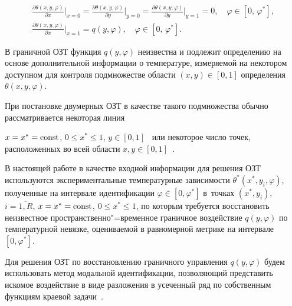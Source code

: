 \begin{gather}\label{eq:ulg:BoundaryCondition2}

\frac{\partial \theta (x,y,\varphi )}{\partial x}\Bigr|_{x=0} = 

\frac{\partial \theta (x,y,\varphi )}{\partial y}\Bigr|_{y=0} = \frac{\partial \theta (x, y,\varphi )}{\partial y}\Bigr|_{y=1} = 0,\quad \varphi  \in [0,\,\varphi ^*],

\\

\label{eq:ulg:BoundaryCondition2}

\frac{\partial \theta (x,y,\varphi )}{\partial x}\Bigr|_{x=1} = q(y,\varphi ),\quad\varphi  \in [0,\,\varphi ^*].

\end{gather}



В граничной ОЗТ функция $q(y,\varphi)$ неизвестна и подлежит определению на основе дополнительной информации о температуре, измеряемой на некотором доступном для контроля подмножестве области $( x,y ) \in [ 0, 1]$ определения $\theta(x,y,\varphi)$.

При постановке двумерных ОЗТ в качестве такого подмножества обычно рассматривается некоторая линия 

$x = {x^*} = \rm const$, $0 \le {x^*} \le 1$, $y \in [ 0,1 ]$~\cite{ulg:bib:Kuzin_2_D, ulg:bib:Alifanov_OZT, ulg:bib:Reinhardt} или некоторое число точек, расположенных во всей области $x, y \in [ 0,1 ]$~\cite{ulg:bib:Ozisik, KolForKuz15}.



В настоящей работе в качестве входной информации для решения ОЗТ используются экспериментальные температурные зависимости $\theta ^*(x^*,{y_i},\varphi )$, полученные на интервале идентификации $\varphi  \in [ 0,\varphi ^* ]$  в~точках  $(x^*,y_i)$, $i = \overline {1,R}$, $x = x^* = \rm const$, $0 \le x^* \le 1$, по которым требуется восстановить неизвестное пространственно"=временное граничное воздействие  $q(y,\varphi)$ по температурной невязке, оцениваемой в равномерной метрике на интервале  $[ 0,\varphi ^* ]$.



\smallskip




Для решения ОЗТ по восстановлению граничного управления $q(y,\varphi)$ будем использовать метод модальной идентификации, позволяющий представить искомое воздействие в виде разложения в усеченный ряд по собственным функциям краевой задачи~\cite{ulg:bib:Koshlyakov_Gliner_Smirnov}.

